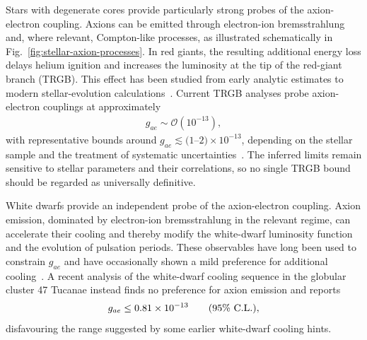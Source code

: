 \documentclass[review]{elsarticle}
\numberwithin{equation}{section}
\numberwithin{table}{section}
\numberwithin{figure}{section}
\begin{document}
Stars with degenerate cores provide particularly strong probes of the axion-electron coupling. Axions can be emitted through electron-ion bremsstrahlung and, where relevant, Compton-like processes, as illustrated schematically in Fig.~\ref{fig:stellar-axion-processes}. In red giants, the resulting additional energy loss delays helium ignition and increases the luminosity at the tip of the red-giant branch (TRGB). This effect has been studied from early analytic estimates to modern stellar-evolution calculations~\cite{Raffelt:1994ry,Viaux:2013lha,Straniero:2020iyi,Capozzi:2020cbu}. Current TRGB analyses probe axion-electron couplings at approximately
\begin{align}
    g_{ae}
    \sim
    \mathcal{O}(10^{-13}),
    \label{eq:stellar-gae-scale}
\end{align}
with representative bounds around $g_{ae}\lesssim(1$--$2)\times10^{-13}$, depending on the stellar sample and the treatment of systematic uncertainties~\cite{Capozzi:2020cbu,Dennis:2023aam}. The inferred limits remain sensitive to stellar parameters and their correlations, so no single TRGB bound should be regarded as universally definitive.

White dwarfs provide an independent probe of the axion-electron coupling. Axion emission, dominated by electron-ion bremsstrahlung in the relevant regime, can accelerate their cooling and thereby modify the white-dwarf luminosity function and the evolution of pulsation periods. These observables have long been used to constrain $g_{ae}$ and have occasionally shown a mild preference for additional cooling~\cite{MillerBertolami:2014rka,Giannotti:2017hny}. A recent analysis of the white-dwarf cooling sequence in the globular cluster 47 Tucanae instead finds no preference for axion emission and reports~\cite{Fleury:2025ahw}
\begin{align}
    g_{ae}
    \leq
    0.81\times10^{-13}
    \qquad
    (95\%~{\rm C.L.}),
    \label{eq:WD-axion-electron-bound}
\end{align}
disfavouring the range suggested by some earlier white-dwarf cooling hints. 
\end{document}
